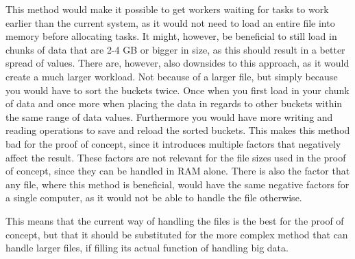 This method would make it possible to get workers waiting for tasks to work earlier than the current system, as it would not need to load an entire file into memory before allocating tasks. It might, however, be beneficial to still load in chunks of data that are 2-4 GB or bigger in size, as this should result in a better spread of values. There are, however, also downsides to this approach, as it would create a much larger workload. Not because of a larger file, but simply because you would have to sort the buckets twice. Once when you first load in your chunk of data and once more when placing the data in regards to other buckets within the same range of data values. Furthermore you would have more writing and reading operations to save and reload the sorted buckets. This makes this method bad for the proof of concept, since it introduces multiple factors that negatively affect the result. These factors are not relevant for the file sizes used in the proof of concept, since they can be handled in RAM alone. There is also the factor that any file, where this method is beneficial, would have the same negative factors for a single computer, as it would not be able to handle the file otherwise. 

This means that the current way of handling the files is the best for the proof of concept, but that it should be substituted for the more complex method that can handle larger files, if filling its actual function of handling big data.


